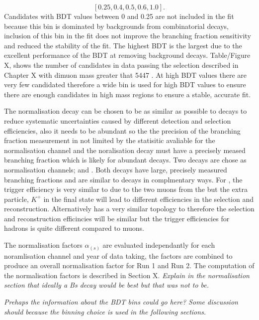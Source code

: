 \begin{equation}

[0.25, 0.4, 0.5, 0.6, 1.0].

\end{equation}
Candidates with BDT values between 0 and 0.25 are not included in the fit because this bin is dominated by backgrounds from combinatorial decays, inclusion of this bin in the fit does not improve the branching fraction sensitivity and reduced the stability of the fit. The highest BDT is the largest due to the excellent performance of the BDT at removing background decays. Table/Figure X, shows the number of \bmumu candidates in data passing the selection described in Chapter X with dimuon mass greater that 5447 \mevcc. At high BDT values there are very few candidated therefore a wide bin is used for high BDT values to ensure there are enough candidates in high mass regions to ensure a stable, accurate fit.

The normalisation decay can be chosen to be as similar as possible to \bmumu decays to reduce systematic uncertainties caused by different detection and selection efficiencies, also it needs to be abundant so the the precision of the branching fraction measurement in not limited by the statisitic avaliable for the normalisation channel and the noralisation decay must have a precisely meased branching fraction which is likely for abundant decays. Two decays are chose as normalisation channels; \bujpsik and \bdkpi. Both decays have large, precisely measured branching fractions and are similar to \bmumu decays in complmentary ways. For \bujpsik, the trigger efficiency is very similar to \bmumu due to the two muons from the \jpsi but the extra particle, $K^{+}$ in the final state will lead to different efficiencies in the selection and reconstruction. Alternatively \bdkpi has a very similar topology to \bmumu therefore the selection and reconstruction efficincies will be similar but the trigger efficiencies for hadrons is quite different compared to muons.  

The normalisation factors $\alpha_{(s)}$ are evaluated independantly for each noramlisation channel and year of data taking, the factors are combined to produce an overall normalisation factor for Run 1 and Run 2. The computation of the normalisation factors is described in Section X. 
{\it Explain in the normalisation section that ideally a Bs decay would be best but that was not to be.}

{\it Prehaps the information about the BDT bins could go here? Some discussion should because the binning choice is used in the following sections.}


